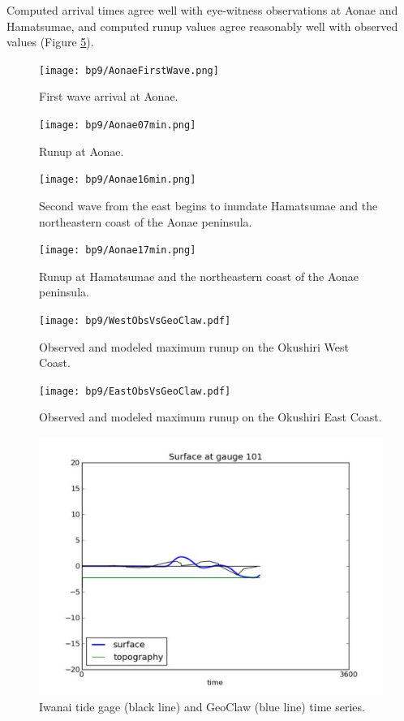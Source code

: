  Computed arrival times agree well with eye-witness observations at Aonae and Hamatsumae, and computed runup values agree reasonably well with observed values (Figure \ref{WestObsVsGeoClaw}).  


\begin{figure}[ht]
\hfil\texttt{[image: bp9/AonaeFirstWave.png]}\hfil
\caption{\label{AonaeFirstWave}
First wave arrival at Aonae.
  }
\end{figure} 

\begin{figure}[ht]
\hfil\texttt{[image: bp9/Aonae07min.png]}\hfil
\caption{\label{Aonae07min}
Runup at Aonae.
  }
\end{figure}

\begin{figure}[ht]
\hfil\texttt{[image: bp9/Aonae16min.png]}\hfil
\caption{\label{Aonae16min}
Second wave from the east begins to inundate Hamatsumae and the northeastern coast of the Aonae peninsula.
  }
\end{figure} 

\begin{figure}[ht]
\hfil\texttt{[image: bp9/Aonae17min.png]}\hfil
\caption{\label{Aonae17min}
Runup at Hamatsumae and the northeastern coast of the Aonae peninsula.
  }
\end{figure} 

\begin{figure}[ht]
\hfil\texttt{[image: bp9/WestObsVsGeoClaw.pdf]}\hfil
\caption{\label{WestObsVsGeoClaw}
Observed and modeled maximum runup on the Okushiri West Coast.
  }
\end{figure} 

\begin{figure}[ht]
\hfil\texttt{[image: bp9/EastObsVsGeoClaw.pdf]}\hfil
\caption{\label{EastObsVsGeoClaw}
Observed and modeled maximum runup on the Okushiri East Coast.
  }
\end{figure} 

\begin{figure}[ht]
\hfil\includegraphics[width=5.0in]{bp9/Iwanai.pdf}\hfil
\caption{\label{Iwanai}
Iwanai tide gage (black line) and GeoClaw (blue line) time series. 
  }
\end{figure}

